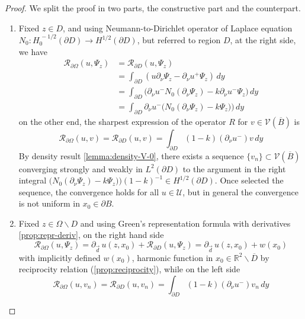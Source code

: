 \documentclass[10pt, a4paper, twoside, openright]{book}
\theoremstyle{definition}
\theoremstyle{plain}
\theoremstyle{plain}
\theoremstyle{plain}
\theoremstyle{plain}
\theoremstyle{plain}
\theoremstyle{plain}
\theoremstyle{plain}
\theoremstyle{plain}
\begin{document}
\begin{proof}
We split the proof in two parts, the constructive part and the counterpart.
 \begin{enumerate}
  \item Fixed $z \in D$, and using Neumann-to-Dirichlet operator of Laplace equation ${N_0}:H^{\,-1/2}_0(\partial D)\to H^{1/2}(\partial D)$, but referred to region $D$, 
    at the right side, we have
    \begin{align}
    \mathcal{R}_{\partial \Omega}(u,\Psi_z) &= \mathcal{R}_{\partial D}(u,\Psi_z) \\
    &= \int_{\partial D}(u\partial_\nu\Psi_z - \partial_\nu u^+ \Psi_z) \,dy\\
    &= \int_{\partial D}\bigl(\partial_\nu u^- {N_0}(\partial_\nu\Psi_z) - k \partial_\nu u^- \Psi_z\bigr) \,dy \\
    &= \int_{\partial D}\partial_\nu u^-\Big( {N_0}(\partial_\nu\Psi_z) - k \Psi_z)\Big) \,dy
    \end{align}
  on the other end, the sharpest expression of the operator $R$ for $v\in\mathcal{V}(\overline{B})$ is
  \begin{equation}
   \mathcal{R}_{\partial \Omega}(u,v) = \mathcal{R}_{\partial D}(u,v) = \int_{\partial D}(1-k)(\partial_\nu u^- )v\,dy
  \end{equation}
  By density result \ref{lemma:density-V-0}, there exists a sequence $\{v_n\}\subset \mathcal{V}(\overline{B})$ converging strongly and weakly in $L^2(\partial D)$ to the argument in the right integral $\bigl( {N_0}(\partial_\nu\Psi_z) - k \Psi_z)\bigr)(1-k)^{-1}\in H^{1/2}(\partial D)$.
  Once selected the sequence, the convergence holds for all $u\in\mathcal{U}$, but in general the convergence is not uniform in $x_0\in \partial B$.
  \item Fixed $z \in \Omega\backslash D$ and using Green's representation formula with derivatives \eqref{prop:repr-deriv}, on the right hand side
  \begin{equation}
   \mathcal{R}_{\partial \Omega}(u,\Psi_z) = \partial_{\vec{d}}\,u(z,x_0) + \mathcal{R}_{\partial D}(u,\Psi_z) = \partial_{\vec{d}}\,u(z,x_0) + w(x_0)
  \end{equation}
  with implicitly defined $w(x_0)$, harmonic function in $x_0 \in \mathbb{R}^2\backslash \overline{D}$ by reciprocity relation (\ref{prop:reciprocity}), while on the left side
  \begin{equation}
   \mathcal{R}_{\partial \Omega}(u,v_n) = \mathcal{R}_{\partial D}(u,v_n) = \int_{\partial D}(1-k)(\partial_\nu u^- )v_n\,dy

\end{equation}
\end{enumerate}
\end{proof}
\end{document}
